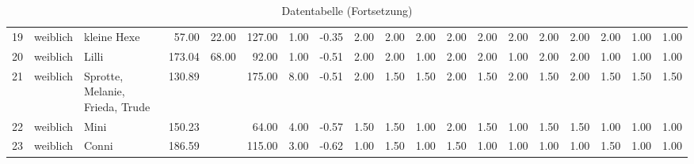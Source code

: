\begin{table}
\begin{center}
{\begin{tabular}{rllrrrrrrrrrrrrrrrr}
  19 & weiblich & kleine Hexe                                                                                                                                                                                                                                                     & 57.00 & 22.00 & 127.00 & 1.00 & -0.35 & 2.00 & 2.00 & 2.00 & 2.00 & 2.00 & 2.00 & 2.00 & 2.00 & 2.00 & 1.00 & 1.00 \\ 
  20 & weiblich & Lilli                                                                                                                                                                                                                                                           & 173.04 & 68.00 & 92.00 & 1.00 & -0.51 & 2.00 & 2.00 & 1.00 & 2.00 & 2.00 & 1.00 & 2.00 & 2.00 & 1.00 & 1.00 & 1.00 \\ 
  21 & weiblich & Sprotte, Melanie, Frieda, Trude                                                                                                                                                                                                                                 & 130.89 &  & 175.00 & 8.00 & -0.51 & 2.00 & 1.50 & 1.50 & 2.00 & 1.50 & 2.00 & 1.50 & 2.00 & 1.50 & 1.50 & 1.50 \\ 
  22 & weiblich & Mini                                                                                                                                                                                                                                                            & 150.23 &  & 64.00 & 4.00 & -0.57 & 1.50 & 1.50 & 1.00 & 2.00 & 1.50 & 1.00 & 1.50 & 1.50 & 1.00 & 1.00 & 1.00 \\ 
  23 & weiblich & Conni                                                                                                                                                                                                                                                           & 186.59 &  & 115.00 & 3.00 & -0.62 & 1.00 & 1.50 & 1.00 & 1.50 & 1.00 & 1.00 & 1.00 & 1.00 & 1.50 & 1.00 & 1.00 \\ 
   \hline
\end{tabular}
}
\caption{Datentabelle (Fortsetzung)}
\label{merkmale}
\end{center}
\end{table}%
